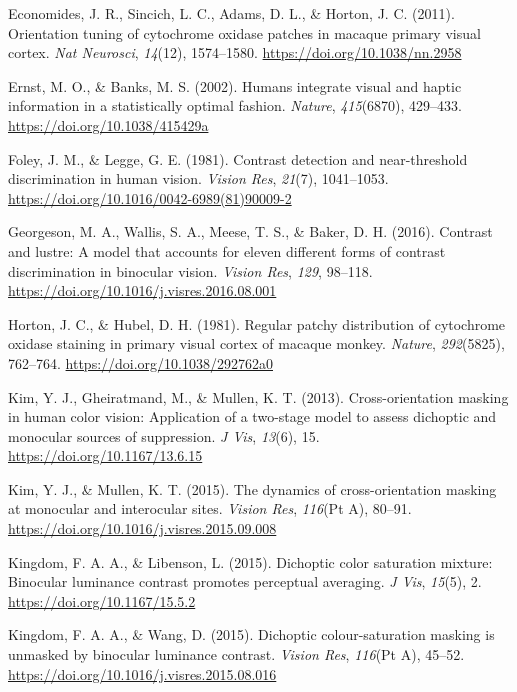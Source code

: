 \documentclass[
  letterpaper,
  DIV=11,
  numbers=noendperiod]{scrartcl}
\newlength{\cslhangindent}
\newenvironment{CSLReferences}[2] %
 {\begin{list}{}{%
  \setlength{\itemindent}{0pt}
  \setlength{\leftmargin}{0pt}
  \setlength{\parsep}{0pt}
  \ifodd #1
   \setlength{\leftmargin}{\cslhangindent}
   \setlength{\itemindent}{-1\cslhangindent}
  \fi
  \setlength{\itemsep}{#2\baselineskip}}}
 {\end{list}}
\begin{document}
\begin{CSLReferences}{1}{0}
Economides, J. R., Sincich, L. C., Adams, D. L., \& Horton, J. C.
(2011). Orientation tuning of cytochrome oxidase patches in macaque
primary visual cortex. \emph{Nat Neurosci}, \emph{14}(12), 1574--1580.
\url{https://doi.org/10.1038/nn.2958}

Ernst, M. O., \& Banks, M. S. (2002). Humans integrate visual and haptic
information in a statistically optimal fashion. \emph{Nature},
\emph{415}(6870), 429--433. \url{https://doi.org/10.1038/415429a}

Foley, J. M., \& Legge, G. E. (1981). Contrast detection and
near-threshold discrimination in human vision. \emph{Vision Res},
\emph{21}(7), 1041--1053.
\url{https://doi.org/10.1016/0042-6989(81)90009-2}

Georgeson, M. A., Wallis, S. A., Meese, T. S., \& Baker, D. H. (2016).
Contrast and lustre: A model that accounts for eleven different forms of
contrast discrimination in binocular vision. \emph{Vision Res},
\emph{129}, 98--118. \url{https://doi.org/10.1016/j.visres.2016.08.001}

Horton, J. C., \& Hubel, D. H. (1981). Regular patchy distribution of
cytochrome oxidase staining in primary visual cortex of macaque monkey.
\emph{Nature}, \emph{292}(5825), 762--764.
\url{https://doi.org/10.1038/292762a0}

Kim, Y. J., Gheiratmand, M., \& Mullen, K. T. (2013). Cross-orientation
masking in human color vision: Application of a two-stage model to
assess dichoptic and monocular sources of suppression. \emph{J Vis},
\emph{13}(6), 15. \url{https://doi.org/10.1167/13.6.15}

Kim, Y. J., \& Mullen, K. T. (2015). The dynamics of cross-orientation
masking at monocular and interocular sites. \emph{Vision Res},
\emph{116}(Pt A), 80--91.
\url{https://doi.org/10.1016/j.visres.2015.09.008}

Kingdom, F. A. A., \& Libenson, L. (2015). Dichoptic color saturation
mixture: Binocular luminance contrast promotes perceptual averaging.
\emph{J Vis}, \emph{15}(5), 2. \url{https://doi.org/10.1167/15.5.2}

Kingdom, F. A. A., \& Wang, D. (2015). Dichoptic colour-saturation
masking is unmasked by binocular luminance contrast. \emph{Vision Res},
\emph{116}(Pt A), 45--52.
\url{https://doi.org/10.1016/j.visres.2015.08.016}


\end{CSLReferences}
\end{document}
